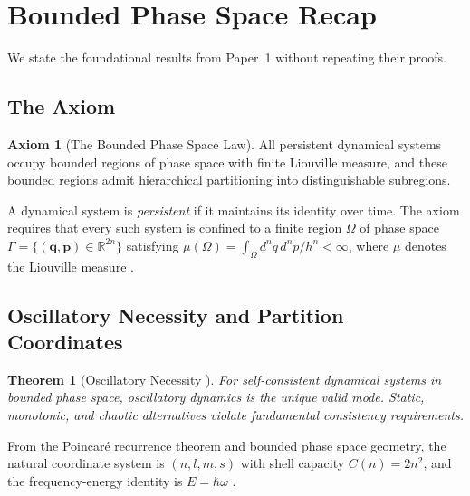 \documentclass[11pt,twocolumn,a4paper]{article}
\newtheorem{theorem}{Theorem}[section]
\theoremstyle{definition}
\newtheorem{axiom}{Axiom}
\theoremstyle{remark}
\newcommand{\Real}{\mathbb{R}}
\begin{document}
\section{Bounded Phase Space Recap}
\label{sec:bps_recap}

We state the foundational results from Paper~1 \citep{sachikonye2025a} without repeating their proofs.

\subsection{The Axiom}

\begin{axiom}[The Bounded Phase Space Law]
\label{ax:bpsl_recap}
All persistent dynamical systems occupy bounded regions of phase space with finite Liouville measure, and these bounded regions admit hierarchical partitioning into distinguishable subregions.
\end{axiom}

A dynamical system is \emph{persistent} if it maintains its identity over time. The axiom requires that every such system is confined to a finite region $\Omega$ of phase space $\Gamma = \{(\mathbf{q}, \mathbf{p}) \in \Real^{2n}\}$ satisfying $\mu(\Omega) = \int_\Omega d^n q \, d^n p / h^n < \infty$, where $\mu$ denotes the Liouville measure \citep{planck1901, landau1976}.

\subsection{Oscillatory Necessity and Partition Coordinates}

\begin{theorem}[Oscillatory Necessity {\citep[Theorem~2.4]{sachikonye2025a}}]
\label{thm:oscillatory_recap}
For self-consistent dynamical systems in bounded phase space, oscillatory dynamics is the unique valid mode. Static, monotonic, and chaotic alternatives violate fundamental consistency requirements.
\end{theorem}

From the Poincar\'{e} recurrence theorem \citep{poincare1890} and bounded phase space geometry, the natural coordinate system is $(n, l, m, s)$ with shell capacity $C(n) = 2n^2$, and the frequency-energy identity is $E = \hbar\omega$ \citep{bohr1913, sachikonye2025a}.
\end{document}
